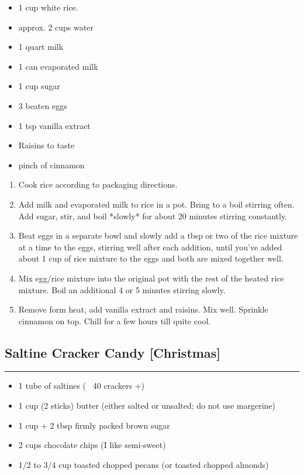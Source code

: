 \documentclass{article}
\begin{document}
\begin{framed}
    \begin{itemize}
        \item 1 cup white rice.
        \item approx. 2 cups water
        \item 1 quart milk 
        \item 1 can evaporated milk 
        \item 1 cup sugar 
        \item 3 beaten eggs 
        \item 1 tsp vanilla extract
        \item Raisins to taste
        \item pinch of cinnamon
    \end{itemize}
\end{framed}

\begin{enumerate}
    \item 
        Cook rice according to packaging directions.
    \item 
        Add milk and evaporated milk to rice in a pot. Bring to a boil stirring often. Add sugar, stir, and boil *slowly* for about 20 minutes stirring constantly. 
    \item 
        Beat eggs in a separate bowl and slowly add a tbsp or two of the rice mixture at a time to the eggs, stirring well after each addition, until you've added about 1 cup of rice mixture to the eggs and both are mixed together well. 
    \item 
        Mix egg/rice mixture into the original pot with the rest of the heated rice mixture. Boil an additional 4 or 5 minutes stirring slowly.
    \item 
        Remove form heat, add vanilla extract and raisins. Mix well. Sprinkle cinnamon on top. Chill for a few hours till quite cool.
\end{enumerate}
\newpage

\subsection{Saltine Cracker Candy [Christmas]} 
\noindent\rule[0.5ex]{\linewidth}{1pt}

\begin{framed}
    \begin{itemize}
        \item 1 tube of saltines (~ 40 crackers +)
        \item 1 cup (2 sticks) butter (either salted or unsalted; do not use margerine)
        \item 1 cup + 2 tbsp firmly packed brown sugar
        \item 2 cups chocolate chips (I like semi-sweet)
        \item 1/2 to 3/4 cup toasted chopped pecans (or toasted chopped almonds)
    \end{itemize}
\end{framed}
\end{document}
